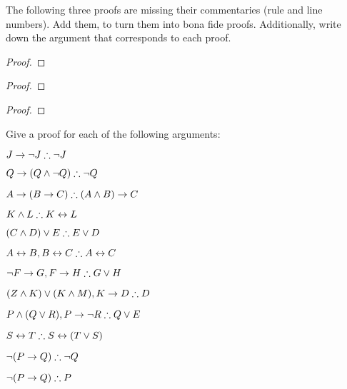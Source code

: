 \problempart
The following three proofs are missing their commentaries (rule and line numbers). Add them, to turn them into bona fide proofs. Additionally, write down the argument that corresponds to each proof.
\begin{multicols}{2}
\begin{proof}
\open
{}
\end{proof}

\begin{proof}
\open
\close
{}%
\end{proof}
\end{multicols}
\begin{proof}
\open
{}
\open
\close
\open
	\open
	\close
\close
{}%
\end{proof}



\problempart
\label{pr.solvedTFLproofs}
Give a proof for each of the following arguments:
\begin{earg}
\item $J\rightarrow\neg J \mathrel{\therefore} \neg J$
\item $Q\rightarrow(Q\wedge\neg Q) \mathrel{\therefore} \neg Q$
\item $A\rightarrow (B\rightarrow C) \mathrel{\therefore} (A\wedge B)\rightarrow C$
\item $K\wedge L \mathrel{\therefore} K\leftrightarrow L$
\item $(C\wedge D)\vee E \mathrel{\therefore} E\vee D$
\item $A\leftrightarrow B, B\leftrightarrow C \mathrel{\therefore} A\leftrightarrow C$
\item $\neg F\rightarrow G, F\rightarrow H \mathrel{\therefore} G\vee H$
\item $(Z\wedge K) \vee (K\wedge M), K \rightarrow D \mathrel{\therefore} D$
\item $P \wedge (Q\vee R), P\rightarrow \neg R \mathrel{\therefore} Q\vee E$
\item $S\leftrightarrow T \mathrel{\therefore} S\leftrightarrow (T\vee S)$
\item $\neg (P \rightarrow Q) \mathrel{\therefore} \neg Q$
\item $\neg (P \rightarrow Q) \mathrel{\therefore} P$
\end{earg}


